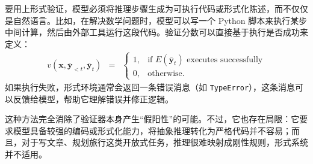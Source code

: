 要用上形式验证，模型必须将推理步骤生成为可执行代码或形式化陈述，而不仅仅是自然语言。比如，在解决数学问题时，模型可以写一个 Python 脚本来执行某步中间计算，然后由外部工具运行这段代码。验证分数可以直接基于执行是否成功来定义：
\begin{eqnarray}
v(\mathbf{x}, \bar{\mathbf{y}}_{<t}, \bar{\mathbf{y}}_t) & = & \begin{cases}
1, & \text{if } E(\bar{\mathbf{y}}_t) \text{ executes successfully} \\
0, & \text{otherwise}.
\end{cases}
\end{eqnarray}
如果执行失败，形式环境通常会返回一条错误消息（如 \texttt{TypeError}），这条消息可以反馈给模型，帮助它理解错误并修正逻辑。

这种方法完全消除了验证器本身产生“假阳性”的可能。不过，它也存在局限：它要求模型具备较强的编码或形式化能力，将抽象推理转化为严格代码并不容易；而且，对于写文章、规划旅行这类开放式任务，推理很难映射成刚性规则，形式系统并不适用。







